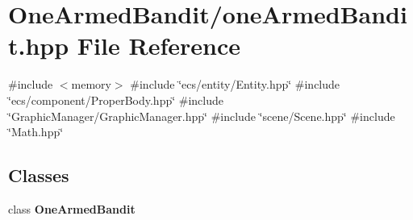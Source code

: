\section{One\+Armed\+Bandit/one\+Armed\+Bandit.hpp File Reference}
\label{one_armed_bandit_8hpp}
{\ttfamily \#include $<$memory$>$}\newline
{\ttfamily \#include \char`\"{}ecs/entity/\+Entity.\+hpp\char`\"{}}\newline
{\ttfamily \#include \char`\"{}ecs/component/\+Proper\+Body.\+hpp\char`\"{}}\newline
{\ttfamily \#include \char`\"{}Graphic\+Manager/\+Graphic\+Manager.\+hpp\char`\"{}}\newline
{\ttfamily \#include \char`\"{}scene/\+Scene.\+hpp\char`\"{}}\newline
{\ttfamily \#include \char`\"{}Math.\+hpp\char`\"{}}\newline
\subsection*{Classes}
\begin{DoxyCompactItemize}
\item 
class \textbf{ One\+Armed\+Bandit}
\end{DoxyCompactItemize}
